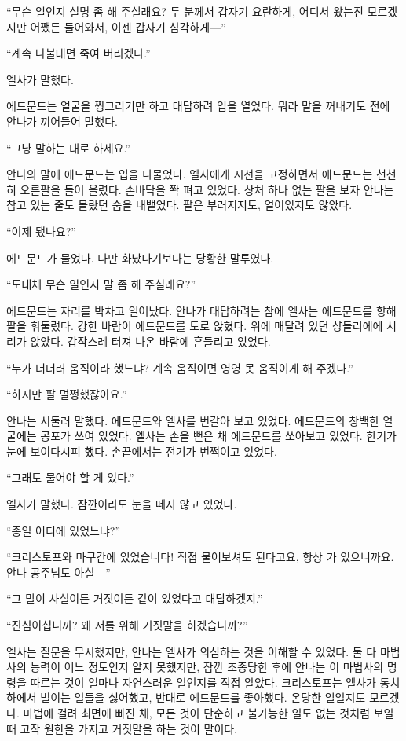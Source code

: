 ``무슨 일인지 설명 좀 해 주실래요? 두 분께서 갑자기 요란하게, 어디서 왔는진 모르겠지만 어쨌든 들어와서, 이젠 갑자기 심각하게—''

``계속 나불대면 죽여 버리겠다.''

엘사가 말했다.

에드문드는 얼굴을 찡그리기만 하고 대답하려 입을 열었다. 뭐라 말을 꺼내기도 전에 안나가 끼어들어 말했다.

``그냥 말하는 대로 하세요.''

안나의 말에 에드문드는 입을 다물었다. 엘사에게 시선을 고정하면서 에드문드는 천천히 오른팔을 들어 올렸다. 손바닥을 쫙 펴고 있었다. 상처 하나 없는 팔을 보자 안나는 참고 있는 줄도 몰랐던 숨을 내뱉었다. 팔은 부러지지도, 얼어있지도 않았다.

``이제 됐나요?''

에드문드가 물었다. 다만 화났다기보다는 당황한 말투였다.

``도대체 무슨 일인지 말 좀 해 주실래요?''

에드문드는 자리를 박차고 일어났다. 안나가 대답하려는 참에 엘사는 에드문드를 향해 팔을 휘둘렀다. 강한 바람이 에드문드를 도로 앉혔다. 위에 매달려 있던 샹들리에에 서리가 앉았다. 갑작스레 터져 나온 바람에 흔들리고 있었다.

``누가 너더러 움직이라 했느냐? 계속 움직이면 영영 못 움직이게 해 주겠다.''

``하지만 팔 멀쩡했잖아요.''

안나는 서둘러 말했다. 에드문드와 엘사를 번갈아 보고 있었다. 에드문드의 창백한 얼굴에는 공포가 쓰여 있었다. 엘사는 손을 뻗은 채 에드문드를 쏘아보고 있었다. 한기가 눈에 보이다시피 했다. 손끝에서는 전기가 번쩍이고 있었다.

``그래도 물어야 할 게 있다.''

엘사가 말했다. 잠깐이라도 눈을 떼지 않고 있었다.

``종일 어디에 있었느냐?''

``크리스토프와 마구간에 있었습니다! 직접 물어보셔도 된다고요, 항상 가 있으니까요. 안나 공주님도 아실—''

``그 말이 사실이든 거짓이든 같이 있었다고 대답하겠지.''

``진심이십니까? 왜 저를 위해 거짓말을 하겠습니까?''

엘사는 질문을 무시했지만, 안나는 엘사가 의심하는 것을 이해할 수 있었다. 둘 다 마법사의 능력이 어느 정도인지 알지 못했지만, 잠깐 조종당한 후에 안나는 이 마법사의 명령을 따르는 것이 얼마나 자연스러운 일인지를 직접 알았다. 크리스토프는 엘사가 통치하에서 벌이는 일들을 싫어했고, 반대로 에드문드를 좋아했다. 온당한 일일지도 모르겠다. 마법에 걸려 최면에 빠진 채, 모든 것이 단순하고 불가능한 일도 없는 것처럼 보일 때 고작 원한을 가지고 거짓말을 하는 것이 말이다.

